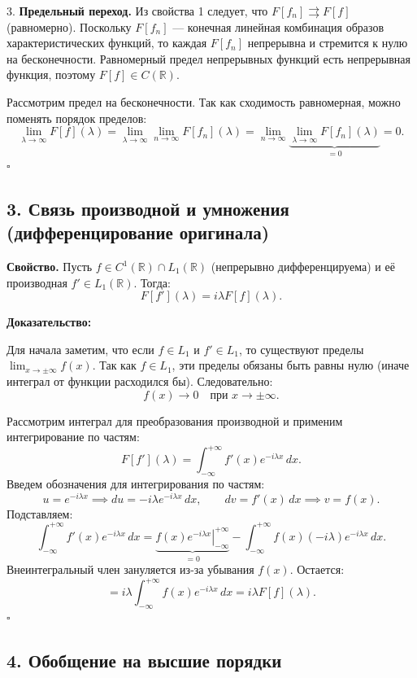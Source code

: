 \documentclass[12pt,a4paper,openany]{book}
\begin{document}
3. \textbf{Предельный переход.}
Из свойства 1 следует, что $F[f_n] \rightrightarrows F[f]$ (равномерно).
Поскольку $F[f_n]$ — конечная линейная комбинация образов характеристических функций, то каждая $F[f_n]$ непрерывна и стремится к нулю на бесконечности.
Равномерный предел непрерывных функций есть непрерывная функция, поэтому $F[f] \in C(\mathbb{R})$.

Рассмотрим предел на бесконечности. Так как сходимость равномерная, можно поменять порядок пределов:
\[
\lim_{\lambda \to \infty} F[f](\lambda) = \lim_{\lambda \to \infty} \lim_{n \to \infty} F[f_n](\lambda) = \lim_{n \to \infty} \underbrace{\lim_{\lambda \to \infty} F[f_n](\lambda)}_{=0} = 0.
\]
\hfill $\square$

\subsection{3. Связь производной и умножения (дифференцирование оригинала)}

\textbf{Свойство.} Пусть $f \in C^1(\mathbb{R}) \cap L_1(\mathbb{R})$ (непрерывно дифференцируема) и её производная $f' \in L_1(\mathbb{R})$. Тогда:
\[
F[f'](\lambda) = i\lambda F[f](\lambda).
\]

\textbf{Доказательство:}

Для начала заметим, что если $f \in L_1$ и $f' \in L_1$, то существуют пределы $\lim_{x \to \pm \infty} f(x)$. Так как $f \in L_1$, эти пределы обязаны быть равны нулю (иначе интеграл от функции расходился бы). Следовательно:
\[
f(x) \to 0 \quad \text{при } x \to \pm \infty.
\]

Рассмотрим интеграл для преобразования производной и применим интегрирование по частям:
\[
F[f'](\lambda) = \int_{-\infty}^{+\infty} f'(x) e^{-i\lambda x} \, dx.
\]
Введем обозначения для интегрирования по частям:
\[
u = e^{-i\lambda x} \implies du = -i\lambda e^{-i\lambda x} \, dx, \qquad dv = f'(x) \, dx \implies v = f(x).
\]
Подставляем:
\[
\int_{-\infty}^{+\infty} f'(x) e^{-i\lambda x} \, dx = \underbrace{\left. f(x) e^{-i\lambda x} \right|_{-\infty}^{+\infty}}_{=0} - \int_{-\infty}^{+\infty} f(x) (-i\lambda) e^{-i\lambda x} \, dx.
\]
Внеинтегральный член зануляется из-за убывания $f(x)$. Остается:
\[
= i\lambda \int_{-\infty}^{+\infty} f(x) e^{-i\lambda x} \, dx = i\lambda F[f](\lambda).
\]
\hfill $\square$

\subsection{4. Обобщение на высшие порядки}
\end{document}

